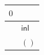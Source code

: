 {\scriptsize\setlength{\tabcolsep}{1.5pt}%
\begin{tabular}{c|l}
$\text{0}$ & \\ \hline
\gcell{$\posD{\bullet}$} & $\mathsf{inl}\,$ \\
\gcell{$$} & $()$ \\
\end{tabular}}
